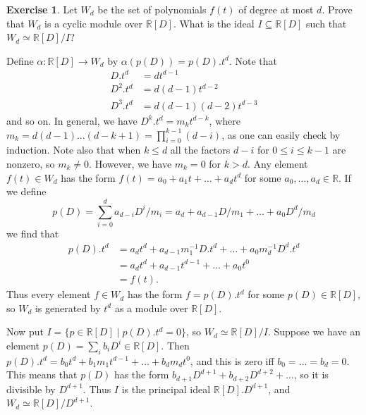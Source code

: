 \documentclass{amsart}
\newcommand{\R}         {{\mathbb{R}}}
\newcommand{\al}        {\alpha}
\newcommand{\sse}       {\subseteq}
\newcommand{\xra}       {\xrightarrow}
\newcommand{\st}        {\;|\;}
\newcommand{\ip}[1]     {\langle #1\rangle}
\renewcommand{\:}{\colon}
\theoremstyle{definition}
\newtheorem{exercise}{Exercise}[section]
\renewenvironment{solution}{\SolutionAtEnd}{\endSolutionAtEnd}
\begin{document}
\begin{exercise}
 Let $W_d$ be the set of polynomials $f(t)$ of degree at most $d$.
 Prove that $W_d$ is a cyclic module over $\R[D]$.  What is the ideal
 $I\sse\R[D]$ such that $W_d\simeq\R[D]/I$?
\end{exercise}
\begin{solution}
 Define $\al\:\R[D]\xra{}W_d$ by $\al(p(D))=p(D).t^d$.  Note that
 \begin{align*}
  D  .t^d &= d t^{d-1} \\
  D^2.t^d &= d(d-1) t^{d-2} \\
  D^3.t^d &= d(d-1)(d-2) t^{d-3}
 \end{align*}
 and so on.  In general, we have $D^k.t^d=m_kt^{d-k}$, where
 $m_k=d(d-1)\ldots(d-k+1)=\prod_{i=0}^{k-1}(d-i)$, as one can easily
 check by induction.  Note also that when $k\leq d$ all the factors
 $d-i$ for $0\leq i\leq k-1$ are nonzero, so $m_k\neq 0$.  However, we
 have $m_k=0$ for $k>d$.  Any element $f(t)\in W_d$ has the form
 $f(t)=a_0+a_1t+\ldots+a_dt^d$ for some $a_0,\ldots,a_d\in\R$.  If we
 define 
 \[ p(D)= \sum_{i=0}^d a_{d-i} D^i/m_i = 
          a_d+a_{d-1}D/m_1+\ldots+a_0D^d/m_d
 \]
 we find that 
 \begin{align*}
  p(D).t^d &=
   a_d t^d + a_{d-1} m_1^{-1} D.t^d + \ldots + a_0 m_d^{-1} D^d.t^d \\
  &= a_d t^d + a_{d-1} t^{d-1} + \ldots + a_0 t^0 \\
  &= f(t).
 \end{align*}
 Thus every element $f\in W_d$ has the form $f=p(D).t^d$ for some
 $p(D)\in\R[D]$, so $W_d$ is generated by $t^d$ as a module over
 $\R[D]$.  

 Now put $I=\{p\in\R[D]\st p(D).t^d=0\}$, so $W_d\simeq\R[D]/I$.
 Suppose we have an element $p(D)=\sum_ib_iD^i\in\R[D]$.  Then
 $p(D).t^d=b_0t^d+b_1m_1t^{d-1}+\ldots+b_dm_dt^0$, and this is zero
 iff $b_0=\ldots=b_d=0$.  This means that $p(D)$ has the form
 $b_{d+1}D^{d+1}+b_{d+2}D^{d+2}+\ldots$, so it is divisible by
 $D^{d+1}$.  Thus $I$ is the principal ideal $\R[D].D^{d+1}$, and
 $W_d\simeq\R[D]/D^{d+1}$.
\end{solution}
\end{document}
